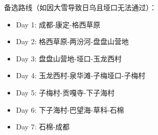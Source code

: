 备选路线（如因大雪导致日乌且垭口无法通过）：
\begin{itemize}
  \item Day 1: 成都-康定-格西草原
  \item Day 2: 格西草原-两汾河-盘盘山营地
  \item Day 3: 盘盘山营地-垭口-玉龙西村
  \item Day 4: 玉龙西村-泉华滩-子梅垭口-子梅村
  \item Day 5: 子梅村-贡嘎寺-下子海村
  \item Day 6: 下子海村-巴望海-草科-石棉
  \item Day 7: 石棉-成都
\end{itemize}
